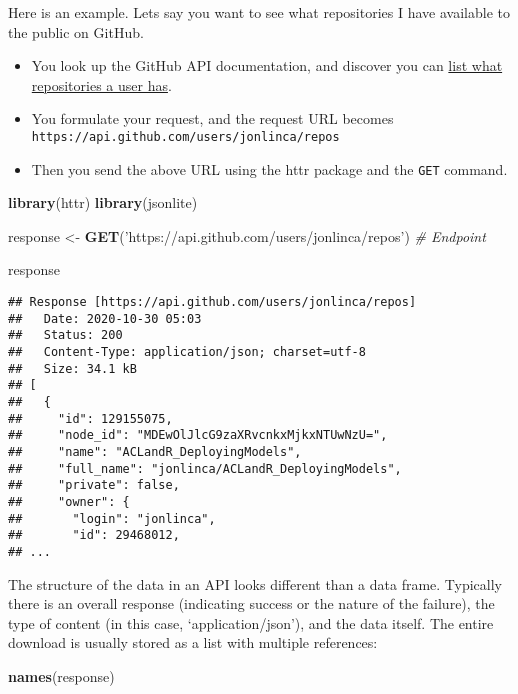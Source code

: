 \documentclass[
]{book}
\newenvironment{Shaded}{\begin{snugshade}}{\end{snugshade}}
\newcommand{\CommentTok}[1]{\textcolor[rgb]{0.56,0.35,0.01}{\textit{#1}}}
\newcommand{\KeywordTok}[1]{\textcolor[rgb]{0.13,0.29,0.53}{\textbf{#1}}}
\newcommand{\NormalTok}[1]{#1}
\newcommand{\StringTok}[1]{\textcolor[rgb]{0.31,0.60,0.02}{#1}}
\providecommand{\tightlist}{%
  \setlength{\itemsep}{0pt}\setlength{\parskip}{0pt}}
\begin{document}
Here is an example. Lets say you want to see what repositories I have available to the public on GitHub.

\begin{itemize}
\tightlist
\item
  You look up the GitHub API documentation, and discover you can \href{https://developer.github.com/v3/repos/\#list-repositories-for-a-user}{list what repositories a user has}.
\item
  You formulate your request, and the request URL becomes \texttt{https://api.github.com/users/jonlinca/repos}
\item
  Then you send the above URL using the httr package and the \texttt{GET} command.
\end{itemize}

\begin{Shaded}
\begin{Highlighting}[]
\KeywordTok{library}\NormalTok{(httr)}
\KeywordTok{library}\NormalTok{(jsonlite)}

\NormalTok{response <-}\StringTok{ }\KeywordTok{GET}\NormalTok{(}\StringTok{'https://api.github.com/users/jonlinca/repos'}\NormalTok{) }\CommentTok{# Endpoint}

\NormalTok{response}
\end{Highlighting}
\end{Shaded}

\begin{verbatim}
## Response [https://api.github.com/users/jonlinca/repos]
##   Date: 2020-10-30 05:03
##   Status: 200
##   Content-Type: application/json; charset=utf-8
##   Size: 34.1 kB
## [
##   {
##     "id": 129155075,
##     "node_id": "MDEwOlJlcG9zaXRvcnkxMjkxNTUwNzU=",
##     "name": "ACLandR_DeployingModels",
##     "full_name": "jonlinca/ACLandR_DeployingModels",
##     "private": false,
##     "owner": {
##       "login": "jonlinca",
##       "id": 29468012,
## ...
\end{verbatim}

The structure of the data in an API looks different than a data frame. Typically there is an overall response (indicating success or the nature of the failure), the type of content (in this case, `application/json'), and the data itself. The entire download is usually stored as a list with multiple references:

\begin{Shaded}
\begin{Highlighting}[]
\KeywordTok{names}\NormalTok{(response)}
\end{Highlighting}
\end{Shaded}
\end{document}
